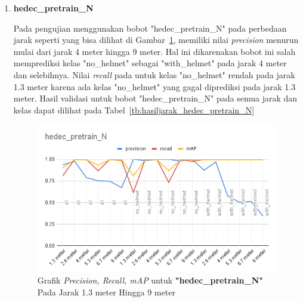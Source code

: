 \begin{enumerate}
  \item \textbf{hedec\_pretrain\_N}
  
  \par Pada pengujian menggunakan bobot "hedec\_pretrain\_N" pada perbedaan jarak seperti yang bisa dilihat di Gambar~\ref{fig:grafvaljarak_hedec_pretrain_N}, memiliki nilai
  \emph{precision} menurun mulai dari jarak 4 meter hingga 9 meter. Hal ini dikarenakan bobot ini salah memprediksi kelas "no\_helmet" sebagai "with\_helmet" pada jarak 4 meter
  dan selebihnya. Nilai \emph{recall} pada untuk kelas "no\_helmet" rendah pada jarak 1.3 meter karena ada kelas "no\_helmet" yang
  gagal diprediksi pada jarak 1.3 meter. Hasil validasi untuk bobot "hedec\_pretrain\_N" pada semua jarak dan kelas dapat dilihat pada Tabel~\ref{tb:hasiljarak_hedec_pretrain_N}

  \begin{figure} [h!]
    \centering
    \includegraphics[width=1\textwidth]{gambar/BerdasarkanJarak/hedec_pretrain_N.png}
    \caption{Grafik \emph{Precision, Recall, mAP} untuk \textbf{"hedec\_pretrain\_N"} Pada Jarak 1.3 meter Hingga 9 meter}
    \label{fig:grafvaljarak_hedec_pretrain_N}  
  \end{figure}

 


\end{enumerate}
